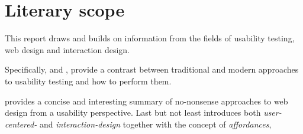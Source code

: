 \documentclass[nofilelist,dvipsnames]{cslthse-msc}
\begin{document}
%
%

%
%

	\section{Literary scope}

		This report draws and builds on information from the fields of usability
		testing, web design and interaction design.

		Specifically,  and
		, provide a contrast between
		traditional and modern approaches to usability testing and how to perform
		them.

		 provides a concise and interesting
		summary of no-nonsense approaches to web design from a usability perspective.
		Last but not least  introduces
		both \textit{user-centered-} and \textit{interaction-design} together
		with the concept of \textit{affordances},

\end{document}
